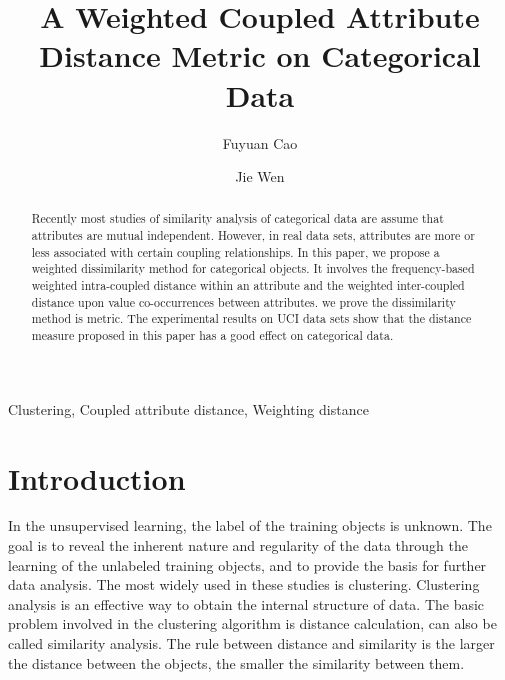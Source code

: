 \documentclass[review]{elsarticle}
\begin{document}
\begin{frontmatter}
\title{A Weighted Coupled Attribute Distance Metric on Categorical Data}

\author[a]{Fuyuan Cao}

\author[a]{Jie Wen}


\address[a]{Key Laboratory of Computational
Intelligence and Chinese Information Processing of Ministry of
Education, School of Computer and Information Technology, Shanxi
University, Taiyuan 030006, China}

\begin{abstract}
Recently most studies of similarity analysis of categorical data are assume that attributes are mutual independent. However, in real data sets, attributes are more or less associated with certain coupling relationships. In this paper, we propose a weighted dissimilarity method for categorical objects. It involves the frequency-based weighted intra-coupled distance within an attribute and the weighted inter-coupled distance upon value co-occurrences between attributes. we prove the dissimilarity method is metric. The experimental results on UCI data sets show that the distance measure proposed in this paper has a good effect on categorical data.
\end{abstract}
\begin{keyword}
Clustering, Coupled attribute distance, Weighting distance
\end{keyword}

\end{frontmatter}

\section{Introduction}
In the unsupervised learning, the label of the training objects is unknown. The goal is to reveal the inherent nature and regularity of the data through the learning of the unlabeled training objects, and to provide the basis for further data analysis. The most widely used in these studies is clustering. Clustering analysis is an effective way to obtain the internal structure of data. The basic problem involved in the clustering algorithm is distance calculation, can also be called similarity analysis. The rule between distance and similarity is the larger the distance between the objects, the smaller the similarity between them.
\end{document}
